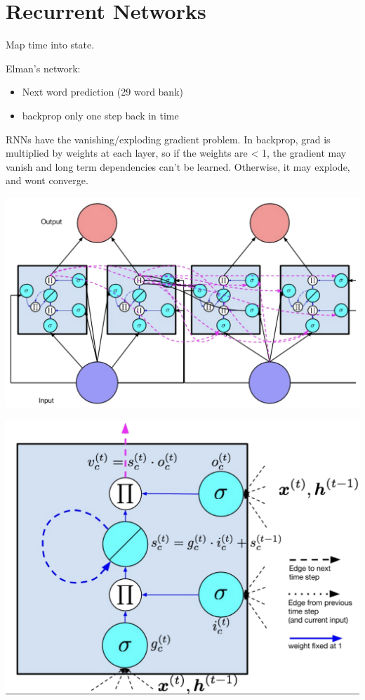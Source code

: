 \section{Recurrent Networks}

Map time into state.

Elman's network:
\begin{itemize}
  \item Next word prediction (29 word bank)
  \item backprop only one step back in time
\end{itemize}

RNNs have the vanishing/exploding gradient problem. In backprop, grad is multiplied by weights
at each layer, so if the weights are < 1, the gradient may vanish and long term dependencies can't
be learned. Otherwise, it may explode, and wont converge.

\includegraphics[width=0.9\columnwidth]{images/lstm_full}

\includegraphics[width=0.9\columnwidth]{images/memcell}
